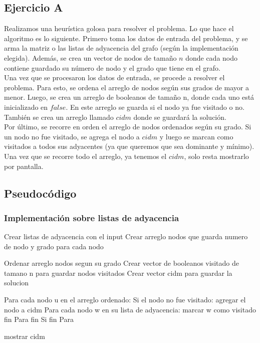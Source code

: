 
\subsection{Ejercicio A}
Realizamos una heurística golosa para resolver el problema. Lo que hace el algoritmo es lo siguiente. Primero toma los datos de entrada del problema, y se arma la matriz o las listas de adyacencia del grafo (según la implementación elegida). Además, se crea un vector de nodos de tamaño $n$ donde cada nodo contiene guardado su número de nodo y el grado que tiene en el grafo. \\
Una vez que se procesaron los datos de entrada, se procede a resolver el problema. Para esto, se ordena el arreglo de nodos según sus grados de mayor a menor. Luego, se crea un arreglo de booleanos de tamaño n, donde cada uno está inicializado en $false$. En este arreglo se guarda si el nodo ya fue visitado o no. También se crea un arreglo llamado $cidm$ donde se guardará la solución. \\
Por último, se recorre en orden el arreglo de nodos ordenados según su grado. Si un nodo no fue visitado, se agrega el nodo a $cidm$ y luego se marcan como visitados a todos sus adyacentes (ya que queremos que sea dominante y mínimo).
Una vez que se recorre todo el arreglo, ya tenemos el $cidm$, solo resta mostrarlo por pantalla.

\subsection{Pseudocódigo}

\subsubsection{Implementación sobre listas de adyacencia}
\begin{codesnippet}
Crear listas de adyacencia con el input
Crear arreglo nodos que guarda numero de nodo y grado para cada nodo

Ordenar arreglo nodos segun su grado
Crear vector de booleanos visitado de tamano n para guardar nodos visitados
Crear vector cidm para guardar la solucion

Para cada nodo u en el arreglo ordenado:
	Si el nodo no fue visitado:
		agregar el nodo a cidm
		Para cada nodo w en su lista de adyacencia:
			marcar w como visitado
		fin Para
	fin Si
fin Para

mostrar cidm
\end{codesnippet}

